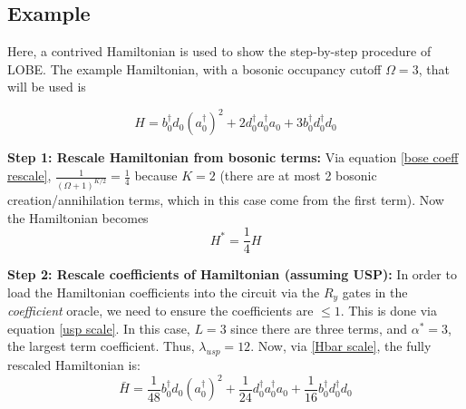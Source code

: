 \subsection{Example}
\label{subsec:example}
Here, a contrived Hamiltonian is used to show the step-by-step procedure of LOBE. The example Hamiltonian, with a bosonic occupancy cutoff $\Omega = 3$, that will be used is 

\begin{equation}
    H = b_0^\dagger d_0(a_0^\dagger)^2 + 2 d_0^\dagger a_0^\dagger a_0+3 b_0^\dagger d_0^\dagger d_0
\end{equation}

\textbf{Step 1: Rescale Hamiltonian from bosonic terms:}
Via equation \ref{bose coeff rescale}, $\frac{1}{(\Omega + 1)^{K/2}} = \frac{1}{4}$ because $K = 2$ (there are at most 2 bosonic creation/annihilation terms, which in this case come from the first term). Now the Hamiltonian becomes 
\begin{equation}
    H^* = \frac{1}{4}H
\end{equation}

\textbf{Step 2: Rescale coefficients of Hamiltonian (assuming USP):} In order to load the Hamiltonian coefficients into the circuit via the $R_y$ gates in the \textit{coefficient} oracle, we need to ensure the coefficients are $\leq 1$. This is done via equation \ref{usp scale}. 
In this case, $L = 3$ since there are three terms, and $\alpha^* = 3$, the largest term coefficient. Thus, $\lambda_{usp} = 12$. Now, via \ref{Hbar scale}, the fully rescaled Hamiltonian is:
\begin{equation}
    \bar{H} = \frac{1}{48}b_0^\dagger d_0(a_0^\dagger)^2 + \frac{1}{24} d_0^\dagger a_0^\dagger a_0+\frac{1}{16} b_0^\dagger d_0^\dagger d_0
\end{equation}

